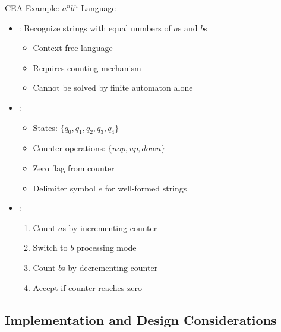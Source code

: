 \begin{frame}{CEA Example: $a^nb^n$ Language}
\begin{itemize}
\item {}: Recognize strings with equal numbers of $a$s and $b$s
\begin{itemize}
\item Context-free language
\item Requires counting mechanism
\item Cannot be solved by finite automaton alone
\end{itemize}
\vspace{0.5cm}
\item {}:
\begin{itemize}
\item States: $\{q_0, q_1, q_2, q_3, q_4\}$
\item Counter operations: $\{nop, up, down\}$
\item Zero flag from counter
\item Delimiter symbol $e$ for well-formed strings
\end{itemize}
\vspace{0.3cm}
\item {}:
\begin{enumerate}
\item Count $a$s by incrementing counter
\item Switch to $b$ processing mode
\item Count $b$s by decrementing counter
\item Accept if counter reaches zero
\end{enumerate}
\end{itemize}
\end{frame}

\subsection{Implementation and Design Considerations}

